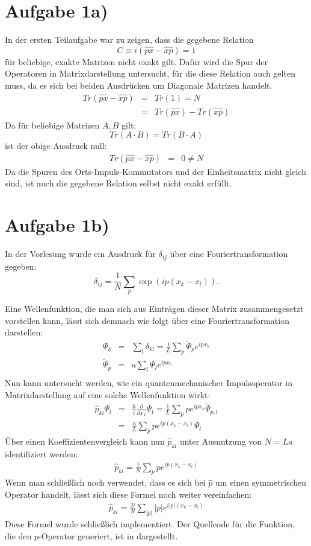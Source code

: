 \section*{Aufgabe 1a)}
In der ersten Teilaufgabe war zu zeigen, dass die gegebene Relation
$$C \equiv i(\hat{p} \hat{x} - \hat{x}\hat{p}) = 1$$ für beliebige, exakte Matrizen
nicht exakt gilt. Dafür wird die Spur der Operatoren in Matrixdarstellung
untersucht, für die diese Relation auch gelten muss, da es sich bei beiden Ausdrücken
um Diagonale Matrizen handelt. 
\begin{eqnarray}
Tr(\hat{p} \hat{x} - \hat{x}\hat{p}) &=& Tr(1) = N\\
&=& Tr(\hat{p} \hat{x}) - Tr(\hat{x}\hat{p})
\end{eqnarray}
Da für beliebige Matrizen $A,B$ gilt: $$Tr(A\cdot B) = Tr(B\cdot A)$$ ist der
obige Ausdruck null:
\begin{eqnarray}
Tr(\hat{p} \hat{x} - \hat{x}\hat{p}) &=& 0 \neq N
\end{eqnarray}
Da die Spuren des Orts-Impuls-Kommutators und der Einheitsmatrix nicht gleich sind,
ist auch die gegebene Relation selbst nicht exakt erfüllt.

\section*{Aufgabe 1b)}
In der Vorlesung wurde ein Ausdruck für $δ_{ij}$ über eine Fouriertransformation
gegeben: $$δ_{ij} = \frac{1}{N}\sum_p\exp(ip(x_k-x_l)).$$ 

Eine Wellenfunktion, die man sich aus Einträgen dieser Matrix zusammengesetzt
vorstellen kann, lässt sich demnach wie folgt über eine Fouriertransformation
darstellen:
\begin{eqnarray}
Ψ_k &=& \sum_l δ_{kl} = \frac{1}{L}\sum_p\tilde{Ψ}_p e^{ipx_k}\\
\tilde{Ψ}_p &=& a\sum_l Ψ_l e^{ipx_l}\\
\end{eqnarray}
Nun kann untersucht werden, wie ein quantenmechanischer Impulsoperator in
Matrixdarstellung auf eine solche Wellenfunktion wirkt:
\begin{eqnarray}
\hat{p}_{kl}Ψ_l &=& \frac{\hbar}{i}\frac{∂}{∂x_k}Ψ_l = \frac{1}{L}\sum_{p} p e^{ipx_k}\tilde{Ψ}_{p,l}\\
&=& \frac{a}{L}\sum_p p e^{ip(x_k-x_l)}Ψ_l
\end{eqnarray}
Über einen Koeffizientenvergleich kann nun $\hat{p}_{kl}$ unter Ausnutzung von
$N = La$ identifiziert werden:
\begin{eqnarray}
\hat{p}_{kl} = \frac{1}{N}\sum_p p e^{ip(x_k-x_l)}
\end{eqnarray}
Wenn man schließlich noch verwendet, dass es sich bei $\hat{p}$ um einen symmetrischen
Operator handelt, lässt sich diese Formel noch weiter vereinfachen:
\begin{eqnarray}
\hat{p}_{kl} = \frac{2i}{N}\sum_{|p|} |p| e^{i|p|(x_k-x_l)}
\end{eqnarray}
Diese Formel wurde schließlich implementiert. Der Quellcode für die Funktion, 
die den $p$-Operator generiert, ist in  dargestellt.


